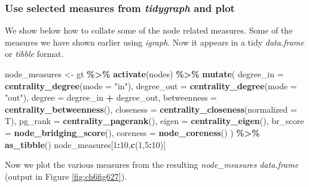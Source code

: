 \documentclass[
]{article}
\newenvironment{Shaded}{\begin{snugshade}}{\end{snugshade}}
\newcommand{\AttributeTok}[1]{\textcolor[rgb]{0.13,0.29,0.53}{#1}}
\newcommand{\DecValTok}[1]{\textcolor[rgb]{0.00,0.00,0.81}{#1}}
\newcommand{\FunctionTok}[1]{\textcolor[rgb]{0.13,0.29,0.53}{\textbf{#1}}}
\newcommand{\NormalTok}[1]{#1}
\newcommand{\OtherTok}[1]{\textcolor[rgb]{0.56,0.35,0.01}{#1}}
\newcommand{\SpecialCharTok}[1]{\textcolor[rgb]{0.81,0.36,0.00}{\textbf{#1}}}
\newcommand{\StringTok}[1]{\textcolor[rgb]{0.31,0.60,0.02}{#1}}
\begin{document}
\hypertarget{use-selected-measures-from-tidygraph-and-plot}{%
\subsubsection{\texorpdfstring{Use selected measures from \emph{tidygraph} and plot}{Use selected measures from tidygraph and plot}}\label{use-selected-measures-from-tidygraph-and-plot}}

We show below how to collate some of the node related measures. Some of the measures we have shown earlier using \emph{igraph}. Now it appears in a tidy \emph{data.frame} or \emph{tibble} format.

\footnotesize

\begin{Shaded}
\begin{Highlighting}[]
\NormalTok{node\_measures }\OtherTok{\textless{}{-}}\NormalTok{ gt }\SpecialCharTok{\%\textgreater{}\%}
     \FunctionTok{activate}\NormalTok{(nodes) }\SpecialCharTok{\%\textgreater{}\%}
     \FunctionTok{mutate}\NormalTok{(}
         \AttributeTok{degree\_in =} \FunctionTok{centrality\_degree}\NormalTok{(}\AttributeTok{mode =} \StringTok{"in"}\NormalTok{),}
         \AttributeTok{degree\_out =} \FunctionTok{centrality\_degree}\NormalTok{(}\AttributeTok{mode =} \StringTok{"out"}\NormalTok{),}
         \AttributeTok{degree =}\NormalTok{ degree\_in }\SpecialCharTok{+}\NormalTok{ degree\_out,}
         \AttributeTok{betweenness =} \FunctionTok{centrality\_betweenness}\NormalTok{(),}
         \AttributeTok{closeness =} \FunctionTok{centrality\_closeness}\NormalTok{(}\AttributeTok{normalized =}\NormalTok{ T),}
         \AttributeTok{pg\_rank =} \FunctionTok{centrality\_pagerank}\NormalTok{(),}
         \AttributeTok{eigen =} \FunctionTok{centrality\_eigen}\NormalTok{(),}
         \AttributeTok{br\_score =} \FunctionTok{node\_bridging\_score}\NormalTok{(),}
         \AttributeTok{coreness =} \FunctionTok{node\_coreness}\NormalTok{()}
\NormalTok{     ) }\SpecialCharTok{\%\textgreater{}\%} \FunctionTok{as\_tibble}\NormalTok{()}
\NormalTok{node\_measures[}\DecValTok{1}\SpecialCharTok{:}\DecValTok{10}\NormalTok{,}\FunctionTok{c}\NormalTok{(}\DecValTok{1}\NormalTok{,}\DecValTok{5}\SpecialCharTok{:}\DecValTok{10}\NormalTok{)]}
\end{Highlighting}
\end{Shaded}

\normalsize

Now we plot the various measures from the resulting \emph{node\_measures} \emph{data.frame} (output in Figure \ref{fig:ch6fig627}).
\end{document}
